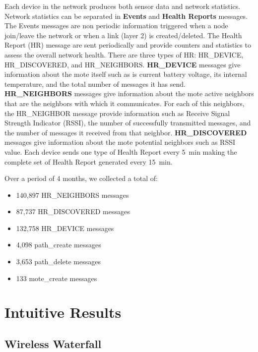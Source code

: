 \documentclass{sig-alternate}
\begin{document}

Each device in the network produces both sensor data and network statistics.
Network statistics can be separated in \textbf{Events} and \textbf{Health Reports} messages.
The Events messages are non periodic information triggered when a node join/leave the network or when a link (layer 2) is created/deleted.
The Health Report (HR) message are sent periodically and provide counters and statistics to assess the overall network health.
There are three types of HR: HR\_DEVICE, HR\_DISCOVERED, and HR\_NEIGHBORS.
\textbf{HR\_DEVICE} messages give information about the mote itself such as is current battery voltage, its internal temperature, and the total number of messages it has send.
\textbf{HR\_NEIGHBORS} messages give information about the mote active neighbors that are the neighbors with which it communicates.
For each of this neighbors, the HR\_NEIGHBOR message provide information such as Receive Signal Strength Indicator (RSSI), the number of successfully transmitted messages, and the number of messages it received from that neighbor.
\textbf{HR\_DISCOVERED} messages give information about the mote potential neighbors such as RSSI value.
Each device sends one type of Health Report every 5~min making the complete set of Health Report generated every 15~min.


Over a period of 4 months, we collected a total of:
\begin{itemize}
    \item 140,897 HR\_NEIGHBORS messages
    \item  87,737 HR\_DISCOVERED messages
    \item 132,758 HR\_DEVICE messages
    \item   4,098 path\_create messages
    \item   3,653 path\_delete messages
    \item     133 mote\_create messages
\end{itemize}

\section{Intuitive Results}
\label{sec:intuitive}

\subsection{Wireless Waterfall}
\end{document}
